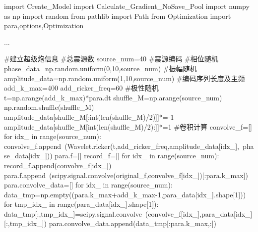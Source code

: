 \documentclass[12pt]{article}
\begin{document}
\begin{python}
import Create_Model
import Calculate_Gradient_NoSave_Pool
import numpy as np
import random
from pathlib import Path
from Optimization import para,options,Optimization

...

#建立超级炮信息
#总震源数
source_num=40        
#震源编码
#相位随机
phase_data=np.random.uniform(0,10,source_num)
#振幅随机
amplitude_data=np.random.uniform(1,10,source_num)
#编码序列长度及主频
add_k_max=400
add_ricker_freq=60
#极性随机
t=np.arange(add_k_max)*para.dt
shuffle_M=np.arange(source_num)
np.random.shuffle(shuffle_M)
amplitude_data[shuffle_M[:int(len(shuffle_M)/2)]]*=-1
amplitude_data[shuffle_M[int(len(shuffle_M)/2):]]*=1
#卷积计算
convolve_f=[]
for idx_ in range(source_num):
    convolve_f.append\
    (Wavelet.ricker(t,add_ricker_freq,amplitude_data[idx_],\
    phase_data[idx_]))   
para.f=[]
record_f=[]
for idx_ in range(source_num):
    record_f.append(convolve_f[idx_])
    para.f.append\
    (scipy.signal.convolve(original_f,convolve_f[idx_])[:para.k_max])
para.convolve_data=[]
for idx_ in range(source_num):
    data_tmp=np.empty((para.k_max+add_k_max-1,para_data[idx_].shape[1]))
    for tmp_idx_ in range(para_data[idx_].shape[1]):
        data_tmp[:,tmp_idx_]=scipy.signal.convolve\
        (convolve_f[idx_],para_data[idx_][:,tmp_idx_])
        para.convolve_data.append(data_tmp[:para.k_max,:])        
            

\end{python}
\end{document}
